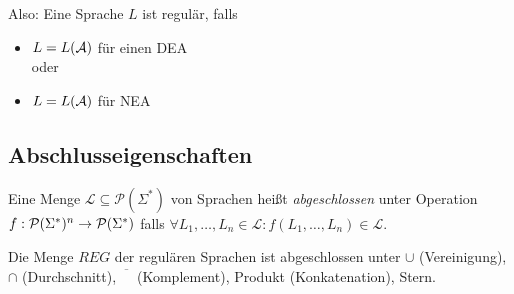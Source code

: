 Also: Eine Sprache $L$ ist regulär, falls
\begin{itemize}
\item $L = L(\mathcal{A})$ für einen \ac{DEA}\\
	oder
\item $L = L(\mathcal{A})$ für \ac{NEA}
\end{itemize}

\subsection{Abschlusseigenschaften}
\begin{Def}[name={[Abgeschlossenheit von $\mathcal{L}$]}]
        Eine Menge $\mathcal{L}\subseteq \mathcal{P}(\Sigma^*)$ von Sprachen heißt \emph{abgeschlossen} unter Operation \\
        $f:\mathcal{P}(\Sigma^*)^n \-> \mathcal{P}(\Sigma^*)$ falls $\forall L_1,\dots, L_n\in \mathcal{L} : f(L_1,\dots, L_n)\in \mathcal{L}$.
\end{Def}
\begin{Satz}[name={[Abgeschlossenheit von $REG$]}]\label{satz:3.8}
        Die Menge $REG$ der regulären Sprachen ist abgeschlossen unter $\cup$ (Vereinigung), $\cap$ (Durchschnitt), $\overline{\phantom{X}}$ (Komplement), Produkt (Konkatenation), Stern.
\end{Satz}
